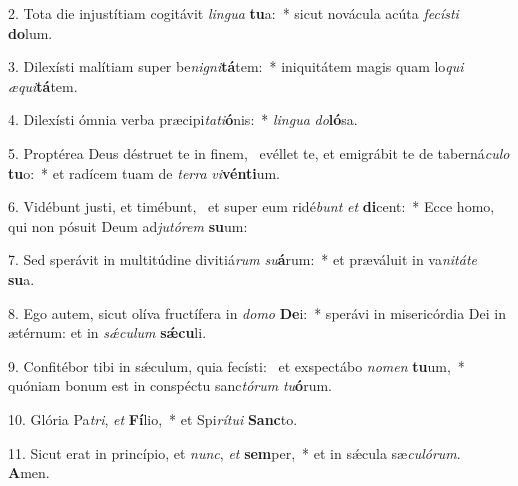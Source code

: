 2. Tota die injustítiam cogitávit \textit{lin}\textit{gua} \textbf{tu}a:~*  sicut novácula acúta \textit{fe}\textit{cís}\textit{ti} \textbf{do}lum.\

3. Dilexísti malítiam super be\textit{ni}\textit{gni}\textbf{tá}tem:~*  iniquitátem magis quam lo\textit{qui} \textit{æ}\textit{qui}\textbf{tá}tem.\

4. Dilexísti ómnia verba præcipi\textit{ta}\textit{ti}\textbf{ó}nis:~*  \textit{lin}\textit{gua} \textit{do}\textbf{ló}sa.\

5. Proptérea Deus déstruet te in finem, \dag\  evéllet te, et emigrábit te de taberná\textit{cu}\textit{lo} \textbf{tu}o:~*  et radícem tuam de \textit{ter}\textit{ra} \textit{vi}\textbf{vén}\textbf{ti}um.\

6. Vidébunt justi, et timébunt, \dag\  et super eum ridé\textit{bunt} \textit{et} \textbf{di}cent:~*  Ecce homo, qui non pósuit Deum ad\textit{ju}\textit{tó}\textit{rem} \textbf{su}um:\

7. Sed sperávit in multitúdine divitiá\textit{rum} \textit{su}\textbf{á}rum:~*  et præváluit in va\textit{ni}\textit{tá}\textit{te} \textbf{su}a.\

8. Ego autem, sicut olíva fructífera in \textit{do}\textit{mo} \textbf{De}i:~*  sperávi in misericórdia Dei in ætérnum: et in \textit{sǽ}\textit{cu}\textit{lum} \textbf{sǽ}\textbf{cu}li.\

9. Confitébor tibi in sǽculum, quia fecísti: \dag\  et exspectábo \textit{no}\textit{men} \textbf{tu}um,~*  quóniam bonum est in conspéctu sanc\textit{tó}\textit{rum} \textit{tu}\textbf{ó}rum.\

10. Glória Pa\textit{tri}, \textit{et} \textbf{Fí}lio,~*  et Spi\textit{rí}\textit{tu}\textit{i} \textbf{Sanc}to.\

11. Sicut erat in princípio, et \textit{nunc}, \textit{et} \textbf{sem}per,~*  et in sǽcula sæ\textit{cu}\textit{ló}\textit{rum}. \textbf{A}men.\

